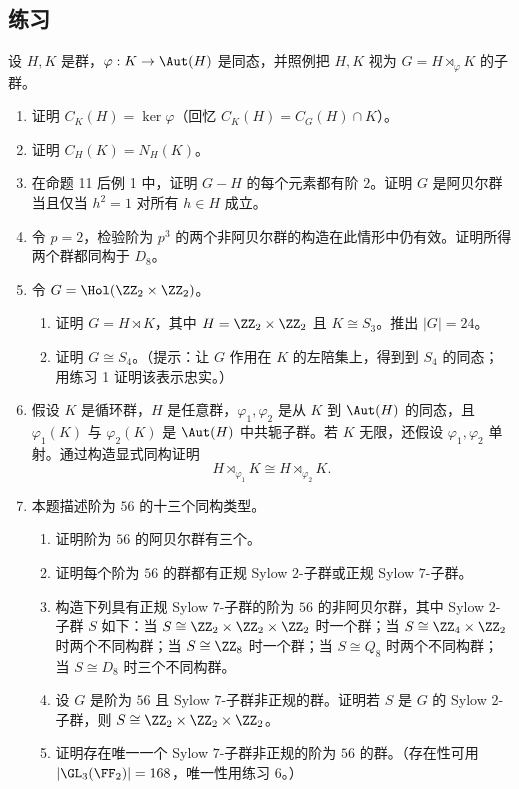 \subsection*{练习}
设 $H,K$ 是群，$\varphi:K\to\Aut(H)$ 是同态，并照例把 $H,K$ 视为 $G=H\rtimes_\varphi K$ 的子群。
\begin{enumerate}[label=\arabic*.]
  \item 证明 $C_K(H)=\ker\varphi$（回忆 $C_K(H)=C_G(H)\cap K$）。
  \item 证明 $C_H(K)=N_H(K)$。
  \item 在命题 11 后例 1 中，证明 $G-H$ 的每个元素都有阶 $2$。证明 $G$ 是阿贝尔群当且仅当 $h^2=1$ 对所有 $h\in H$ 成立。
  \item 令 $p=2$，检验阶为 $p^3$ 的两个非阿贝尔群的构造在此情形中仍有效。证明所得两个群都同构于 $D_8$。
  \item 令 $G=\Hol(\ZZ_2\times\ZZ_2)$。
  \begin{enumerate}[label=(\alph*)]
    \item 证明 $G=H\rtimes K$，其中 $H=\ZZ_2\times\ZZ_2$ 且 $K\cong S_3$。推出 $|G|=24$。
    \item 证明 $G\cong S_4$。（提示：让 $G$ 作用在 $K$ 的左陪集上，得到到 $S_4$ 的同态；用练习 1 证明该表示忠实。）
  \end{enumerate}
  \item 假设 $K$ 是循环群，$H$ 是任意群，$\varphi_1,
\varphi_2$ 是从 $K$ 到 $\Aut(H)$ 的同态，且 $\varphi_1(K)$ 与 $\varphi_2(K)$ 是 $\Aut(H)$ 中共轭子群。若 $K$ 无限，还假设 $\varphi_1,
\varphi_2$ 单射。通过构造显式同构证明
  \[
    H\rtimes_{\varphi_1}K\cong H\rtimes_{\varphi_2}K.
  \]

  \item 本题描述阶为 $56$ 的十三个同构类型。
  \begin{enumerate}[label=(\alph*)]
    \item 证明阶为 $56$ 的阿贝尔群有三个。
    \item 证明每个阶为 $56$ 的群都有正规 Sylow $2$-子群或正规 Sylow $7$-子群。
    \item 构造下列具有正规 Sylow $7$-子群的阶为 $56$ 的非阿贝尔群，其中 Sylow $2$-子群 $S$ 如下：当 $S\cong\ZZ_2\times\ZZ_2\times\ZZ_2$ 时一个群；当 $S\cong\ZZ_4\times\ZZ_2$ 时两个不同构群；当 $S\cong\ZZ_8$ 时一个群；当 $S\cong Q_8$ 时两个不同构群；当 $S\cong D_8$ 时三个不同构群。
    \item 设 $G$ 是阶为 $56$ 且 Sylow $7$-子群非正规的群。证明若 $S$ 是 $G$ 的 Sylow $2$-子群，则 $S\cong\ZZ_2\times\ZZ_2\times\ZZ_2$。
    \item 证明存在唯一一个 Sylow $7$-子群非正规的阶为 $56$ 的群。（存在性可用 $|\GL_3(\FF_2)|=168$，唯一性用练习 6。）
  \end{enumerate}


\end{enumerate}
